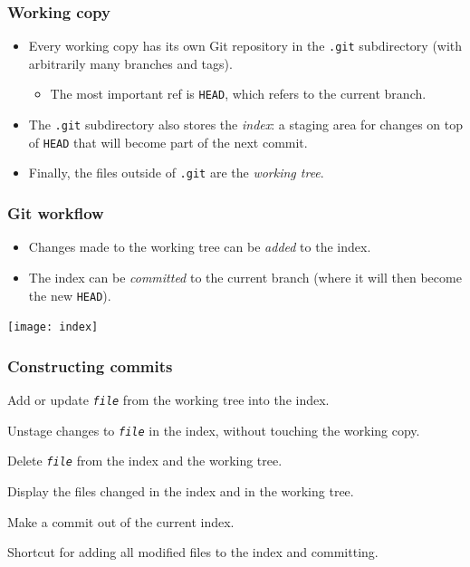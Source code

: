 \documentclass{beamer}
\begin{document}
\begin{frame}
  \frametitle{Working copy}
  \begin{itemize}
  \item Every working copy has its own Git repository in the
    \texttt{.git} subdirectory (with arbitrarily many branches and
    tags).
    \begin{itemize}
    \item The most important ref is \texttt{HEAD}, which refers to the
      current branch.
    \end{itemize}
  \item The \texttt{.git} subdirectory also stores the \emph{index}: a
    staging area for changes on top of \texttt{HEAD} that will become
    part of the next commit.
  \item Finally, the files outside of \texttt{.git} are the
    \emph{working tree}.
  \end{itemize}
\end{frame}

\begin{frame}
  \frametitle{Git workflow}
  \begin{itemize}
  \item Changes made to the working tree can be \emph{added} to the
    index.
  \item The index can be \emph{committed} to the current branch (where
    it will then become the new \texttt{HEAD}).
  \end{itemize}

  \begin{center}
    \texttt{[image: index]}
  \end{center}
\end{frame}

\begin{frame}
  \frametitle{Constructing commits}
  \begin{description}
  \item[\texttt{git add \textit{file}}] Add or update
    \texttt{\textit{file}} from the working tree into the index.
  \item[\texttt{git reset \textit{file}}] Unstage changes to
    \texttt{\textit{file}} in the index, without touching the working
    copy.
  \item[\texttt{git rm \textit{file}}] Delete \texttt{\textit{file}}
    from the index and the working tree.
  \item[\texttt{git status}] Display the files changed in the index
    and in the working tree.
  \item[\texttt{git commit}] Make a commit out of the current index.
  \item[\texttt{git commit -a}] Shortcut for adding all modified files
    to the index and committing.
  \end{description}
\end{frame}
\end{document}
